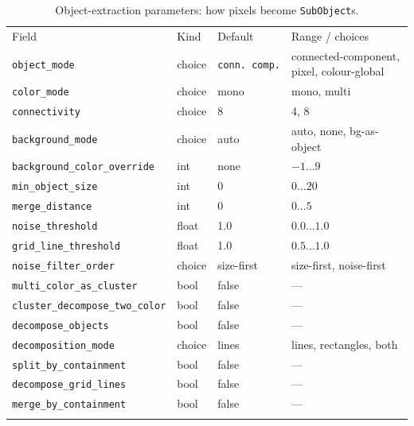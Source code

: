\begin{table}[htbp]
\centering
\caption{Object-extraction parameters: how pixels become \texttt{SubObject}s.}
\label{tab:app-cfg-extract}
\small
\begin{tabular}{p{4.6cm}p{1.7cm}p{2.2cm}p{4.0cm}}
\hline\noalign{\smallskip}
Field & Kind & Default & Range / choices \\
\noalign{\smallskip}\hline\noalign{\smallskip}
\texttt{object\_mode} & choice & \texttt{conn.\ comp.} & connected-component, pixel, colour-global \\
\texttt{color\_mode} & choice & mono & mono, multi \\
\texttt{connectivity} & choice & 8 & 4, 8 \\
\texttt{background\_mode} & choice & auto & auto, none, bg-as-object \\
\texttt{background\_color\_override} & int & none & $-1 \ldots 9$ \\
\texttt{min\_object\_size} & int & 0 & $0 \ldots 20$ \\
\texttt{merge\_distance} & int & 0 & $0 \ldots 5$ \\
\texttt{noise\_threshold} & float & 1.0 & $0.0 \ldots 1.0$ \\
\texttt{grid\_line\_threshold} & float & 1.0 & $0.5 \ldots 1.0$ \\
\texttt{noise\_filter\_order} & choice & size-first & size-first, noise-first \\
\texttt{multi\_color\_as\_cluster} & bool & false & --- \\
\texttt{cluster\_decompose\_two\_color} & bool & false & --- \\
\texttt{decompose\_objects} & bool & false & --- \\
\texttt{decomposition\_mode} & choice & lines & lines, rectangles, both \\
\texttt{split\_by\_containment} & bool & false & --- \\
\texttt{decompose\_grid\_lines} & bool & false & --- \\
\texttt{merge\_by\_containment} & bool & false & --- \\
\noalign{\smallskip}\hline
\end{tabular}
\end{table}


